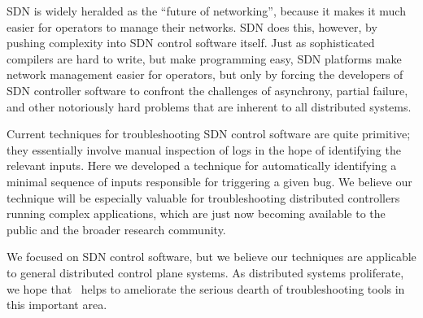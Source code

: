
SDN is widely heralded as the ``future of networking'', because it makes it
much easier for operators to manage their networks. SDN does this, however, by
pushing complexity into SDN control software itself. Just as sophisticated
compilers are hard to write, but make programming easy, SDN platforms make
network management easier for operators, but only by forcing the developers of
SDN controller software to confront the challenges of asynchrony, partial failure, and
other notoriously hard problems that are inherent to all distributed systems.

Current techniques for troubleshooting SDN control software are quite primitive; they
essentially involve manual inspection of logs in the hope of identifying the
relevant inputs. Here we developed a technique for automatically
identifying a minimal sequence of inputs responsible for triggering a given
bug. We believe our technique will be especially valuable for troubleshooting
distributed controllers running complex applications, which are just now
becoming available to the public and the broader research community.

We focused on SDN control software, but we believe our techniques
are applicable to general distributed control plane systems. As distributed systems
proliferate, we hope that \simulator~helps to ameliorate the serious dearth of
troubleshooting tools in this important area.



